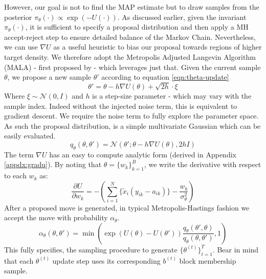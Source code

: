 \documentclass{article}
\newcommand{\Gaussian}{\mathcal{N}}
\begin{document}
However, our goal is not to find the MAP estimate but to draw samples from the posterior $\pi_\theta(\cdot) \propto \exp(-U(\cdot))$. As discussed earlier, given the invariant $\pi_\theta(\cdot)$, it is sufficient to specify a proposal distribution and then apply a MH accept-reject step to ensure detailed balance of the Markov Chain. Nevertheless, we can use $\nabla U$ as a useful heuristic to bias our proposal towards regions of higher target density. We therefore adopt the Metropolis Adjusted Langevin Algorithm (MALA) - first proposed by \citet{mala-tweedie} - which leverages just that. Given the current sample $\theta$, we propose a new sample $\theta'$ according to equation \ref{eqn:theta-update}
%
\begin{equation}
	\theta' = \theta - h \nabla U(\theta) + \sqrt{2h} \cdot \xi
	\label{eqn:theta-update}
\end{equation}
%
Where $\xi \sim \Gaussian(0, I)$ and $h$ is a step-size parameter - which may vary with the sample index. Indeed without the injected noise term, this is equivalent to gradient descent. We require the noise term to fully explore the parameter space. As such the proposal distribution, is a simple multivariate Gaussian which can be easily evaluated.
%
\begin{equation}
	q_\theta(\theta, \theta') = \Gaussian \left( \theta' ; \theta - h \nabla U(\theta), 2h I \right)
\end{equation}
%
The term $\nabla U$ has an easy to compute analytic form (derived in Appendix \ref{appdx:gradu}). By noting that $\theta = \{w_k\}_{k=1}^{B}$, we write the derivative with respect to each $w_k$ as:
%
\begin{equation}
	\frac{\partial U}{\partial w_k} = - \left( \sum_{i=1}^{N} \Big\{ \tilde{x}_i (y_{ik} - a_{ik}) \Big\} - \frac{w_k}{\sigma_\theta^2} \right)
	\label{eqn:U-derivative}
\end{equation}
%
After a proposed move is generated, in typical Metropolis-Hastings fashion we accept the move with probability $\alpha_\theta$.
%
\begin{equation}
	\alpha_\theta(\theta, \theta') = \min \left( 
	\exp \left( U(\theta) - U(\theta')\right)
	\frac{ 
		q_\theta(\theta', \theta)
	}{
		q_\theta(\theta, \theta')
	} 
	, 1 \right)
\end{equation}
%
This fully specifies, the sampling procedure to generate $\{\theta^{(t)}\}_{t=1}^T$. Bear in mind that each $\theta^{(t)}$ update step uses its corresponding $b^{(t)}$ block membership sample.
\end{document}
